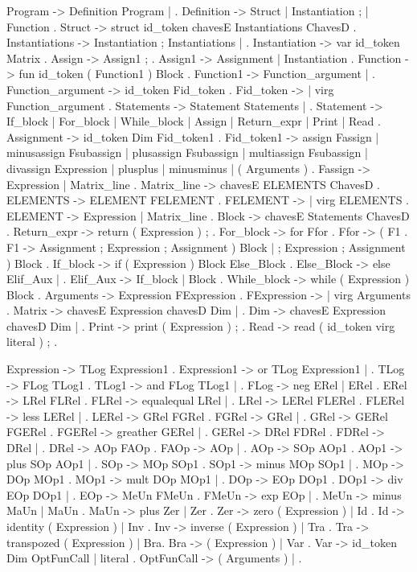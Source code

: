 Program -> Definition Program | .
Definition -> Struct | Instantiation ; | Function .
Struct -> struct id_token chavesE Instantiations ChavesD .
Instantiations -> Instantiation ; Instantiations | .
Instantiation -> var id_token Matrix .
Assign -> Assign1 ; .
Assign1 -> Assignment | Instantiation .
Function -> fun id_token ( Function1 ) Block .
Function1 -> Function_argument | .
Function_argument -> id_token Fid_token .
Fid_token -> | virg Function_argument .
Statements -> Statement Statements | .
Statement -> If_block | For_block | While_block | Assign | Return_expr | Print | Read .
Assignment -> id_token Dim Fid_token1 .
Fid_token1 -> assign Fassign | minusassign Fsubassign | plusassign Fsubassign | multiassign Fsubassign | divassign Expression | plusplus | minusminus | ( Arguments ) .
Fassign -> Expression | Matrix_line .
Matrix_line -> chavesE ELEMENTS ChavesD .
ELEMENTS -> ELEMENT FELEMENT .
FELEMENT -> | virg ELEMENTS .
ELEMENT -> Expression | Matrix_line .
Block -> chavesE Statements ChavesD .
Return_expr -> return ( Expression ) ; .
For_block -> for Ffor .
Ffor -> ( F1 .
F1 -> Assignment ; Expression ; Assignment ) Block | ; Expression ; Assignment ) Block .
If_block -> if ( Expression ) Block Else_Block .
Else_Block -> else Elif_Aux | .
Elif_Aux -> If_block | Block .
While_block -> while ( Expression ) Block .
Arguments -> Expression FExpression .
FExpression -> | virg Arguments .
Matrix -> chavesE Expression chavesD Dim | .
Dim -> chavesE Expression chavesD Dim | .
Print -> print ( Expression ) ; .
Read -> read ( id_token virg literal ) ; .



Expression -> TLog Expression1 .
Expression1 -> or TLog Expression1 | .
TLog -> FLog TLog1 .
TLog1 -> and FLog TLog1 | .
FLog -> neg ERel | ERel .
ERel -> LRel FLRel .
FLRel -> equalequal LRel | .
LRel -> LERel FLERel .
FLERel -> less LERel | .
LERel -> GRel FGRel .
FGRel -> \leq GRel | .
GRel -> GERel FGERel .
FGERel -> greather GERel | .
GERel -> DRel FDRel .
FDRel -> \geq DRel | .
DRel -> AOp FAOp .
FAOp -> \neq AOp | .
AOp -> SOp AOp1 .
AOp1 -> plus SOp AOp1 | .
SOp -> MOp SOp1 .
SOp1 -> minus MOp SOp1 | .
MOp -> DOp MOp1 .
MOp1 -> mult DOp MOp1 | .
DOp -> EOp DOp1 .
DOp1 -> div EOp DOp1 | .
EOp -> MeUn FMeUn .
FMeUn -> exp EOp | .
MeUn -> minus MaUn | MaUn .
MaUn -> plus Zer | Zer .
Zer -> zero ( Expression ) | Id .
Id -> identity ( Expression ) | Inv .
Inv -> inverse ( Expression ) | Tra .
Tra -> transpozed ( Expression ) | Bra.
Bra -> ( Expression ) | Var .
Var -> id_token Dim OptFunCall | literal .
OptFunCall -> ( Arguments ) | .
